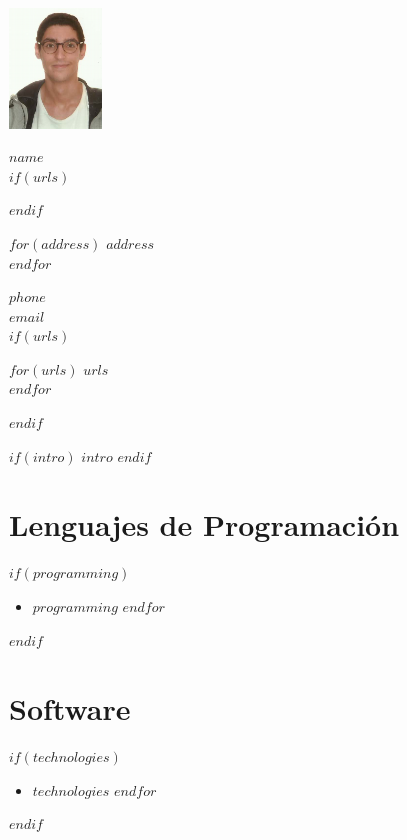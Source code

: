 \documentclass[$fontsize$, a4paper]{article}
\newcommand{\note}[1]{\marginnote{\scriptsize #1}}
\begin{document}
\hfill \includegraphics[width = 70pt]{./photo.png}

{\LARGE $name$}\\[.2cm]

$if(urls)$
\begin{multicols}{2}
$endif$

$for(address)$
$address$\\
$endfor$
\vspace{-10pt}

\faPhone \hspace{2 mm} $phone$\\
\faEnvelope \hspace{2 mm} \href{mailto:$email$}{$email$}\\

$if(urls)$
\columnbreak

$for(urls)$
\href{https://$urls$}{$urls$}\\
$endfor$
\end{multicols}
$endif$

\vspace{30pt}

$if(intro)$
$intro$
$endif$

\section*{Lenguajes de Programación}
$if(programming)$
\begin{itemize}
  $for(programming)$
    \item $programming$
  $endfor$
\end{itemize}
$endif$

\section*{Software}
$if(technologies)$
\begin{itemize}
  $for(technologies)$
\item $technologies$
  $endfor$
\end{itemize}
$endif$

\vspace{25pt}

\end{document}
